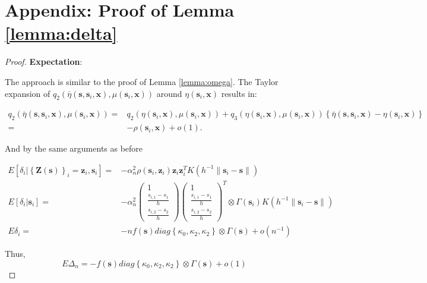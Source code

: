 \documentclass[12pt,english,authoryear, review]{article}\usepackage[]{graphicx}\usepackage[]{color}
\theoremstyle{plain}
\theoremstyle{plain}
\begin{document}
\section*{Appendix: Proof of Lemma \ref{lemma:delta}}
\begin{proof}
\textbf{Expectation}:

The approach is similar to the proof of Lemma \ref{lemma:omega}.
The Taylor expansion of $q_{2}\left(\bar{\eta}\left(\bm{s},\bm{s}_{i},\bm{x}\right),\mu\left(\bm{s}_{i},\bm{x}\right)\right)$
around $\eta\left(\bm{s}_{i},\bm{x}\right)$ results in:

\begin{align*}
q_{2}\left(\bar{\eta}\left(\bm{s},\bm{s}_{i},\bm{x}\right),\mu\left(\bm{s}_{i},\bm{x}\right)\right)= & q_{2}\left(\eta\left(\bm{s}_{i},\bm{x}\right),\mu\left(\bm{s}_{i},\bm{x}\right)\right)+q_{3}\left(\eta\left(\bm{s}_{i},\bm{x}\right),\mu\left(\bm{s}_{i},\bm{x}\right)\right)\left\{ \bar{\eta}\left(\bm{s},\bm{s}_{i},\bm{x}\right)-\eta\left(\bm{s}_{i},\bm{x}\right)\right\} \\
= & -\rho\left(\bm{s}_{i},\bm{x}\right)+o\left(1\right).
\end{align*}


And by the same arguments as before

\begin{align*}
E\left[\delta_{i}|\left\{ \bm{Z}\left(\bm{s}\right)\right\} _{i}=\bm{z}_{i},\bm{s}_{i}\right]= & -\alpha_{n}^{2}\rho\left(\bm{s}_{i},\bm{z}_{i}\right)\bm{z}_{i}\bm{z}_{i}^{T}K\left(h^{-1}\|\bm{s}_{i}-\bm{s}\|\right)\\
E\left[\delta_{i}|\bm{s}_{i}\right]= & -\alpha_{n}^{2}\left(\begin{array}{c}
1\\
\frac{s_{i,1}-s_{1}}{h}\\
\frac{s_{i,2}-s_{2}}{h}
\end{array}\right)\left(\begin{array}{c}
1\\
\frac{s_{i,1}-s_{1}}{h}\\
\frac{s_{i,2}-s_{2}}{h}
\end{array}\right)^{T}\otimes\Gamma\left(\bm{s}_{i}\right)K\left(h^{-1}\|\bm{s}_{i}-\bm{s}\|\right)\\
E\delta_{i}= & -nf\left(\bm{s}\right)diag\left\{ \kappa_{0},\kappa_{2},\kappa_{2}\right\} \otimes\Gamma\left(\bm{s}\right)+o\left(n^{-1}\right)
\end{align*}


Thus, 
\[
E\Delta_{n}=-f\left(\bm{s}\right)diag\left\{ \kappa_{0},\kappa_{2},\kappa_{2}\right\} \otimes\Gamma\left(\bm{s}\right)+o\left(1\right)
\]



\end{proof}
\end{document}
